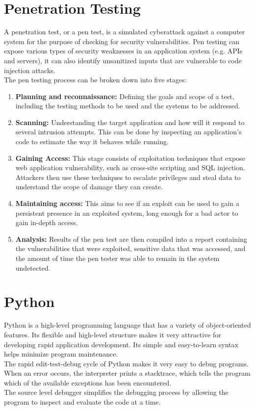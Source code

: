 \section{Penetration Testing}
A penetration test, or a pen test, is a simulated cyberattack against a computer system for the purpose of checking for security vulnerabilities. Pen testing can expose various types of security weaknesses in an application system (e.g. APIs and servers), it can also identify unsanitized inputs that are vulnerable to code injection attacks.\\
The pen testing process can be broken down into five stages:\\
\begin{enumerate}
    \item \textbf{Planning and reconnaissance:} Defining the goals and scope of a test, including the testing methods to be used and the systems to be addressed.
    \item \textbf{Scanning:} Understanding the target application and how will it respond to several intrusion attempts. This can be done by inspecting an application’s code to estimate the way it behaves while running.
    \item \textbf{Gaining Access:} This stage consists of exploitation techniques that expose web application vulnerability, such as cross-site scripting and SQL injection. Attackers then use these techniques to escalate privileges and steal data to understand the scope of damage they can create.
    \item \textbf{Maintaining access:} This aims to see if an exploit can be used to gain a persistent presence in an exploited system, long enough for a bad actor to gain in-depth access.
    \item \textbf{Analysis:} Results of the pen test are then compiled into a report containing the vulnerabilities that were exploited, sensitive data that was accessed, and the amount of time the pen tester was able to remain in the system undetected\cite{pentest}.
\end{enumerate}

\section{Python}
Python is a high-level programming language that has a variety of object-oriented features. Its flexible and high-level structure makes it very attractive for developing rapid application development. Its simple and easy-to-learn syntax helps minimize program maintenance.\\
The rapid edit-test-debug cycle of Python makes it very easy to debug programs. When an error occurs, the interpreter prints a stacktrace, which tells the program which of the available exceptions has been encountered.\\
The source level debugger simplifies the debugging process by allowing the program to inspect and evaluate the code at a time\cite{python.org}.

